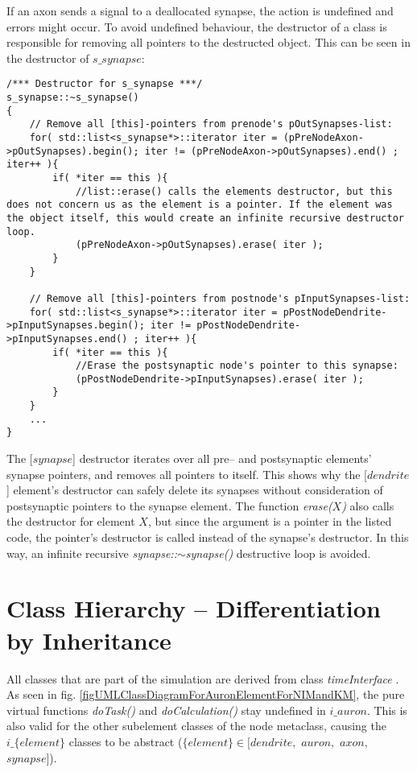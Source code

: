 			If an axon sends a signal to a deallocated synapse, the action is undefined and errors might occur.
			To avoid undefined behaviour, the destructor of a class is responsible for removing all pointers to the destructed object.
			This can be seen in the destructor of $s\_synapse$:
\begin{lstlisting}
/*** Destructor for s_synapse ***/
s_synapse::~s_synapse()
{
	// Remove all [this]-pointers from prenode's pOutSynapses-list:
	for( std::list<s_synapse*>::iterator iter = (pPreNodeAxon->pOutSynapses).begin(); iter != (pPreNodeAxon->pOutSynapses).end() ; iter++ ){
		if( *iter == this ){ 	
			//list::erase() calls the elements destructor, but this does not concern us as the element is a pointer. If the element was the object itself, this would create an infinite recursive destructor loop.
			(pPreNodeAxon->pOutSynapses).erase( iter );
		}
	}

	// Remove all [this]-pointers from postnode's pInputSynapses-list:
	for( std::list<s_synapse*>::iterator iter = pPostNodeDendrite->pInputSynapses.begin(); iter != pPostNodeDendrite->pInputSynapses.end() ; iter++ ){
		if( *iter == this ){ 
			//Erase the postsynaptic node's pointer to this synapse:
			(pPostNodeDendrite->pInputSynapses).erase( iter ); 
		}
	}
	...
}
\end{lstlisting}
		The [$synapse$] destructor iterates over all pre-- and postsynaptic elements' synapse pointers, and removes all pointers to itself.
		This shows why the [$dendrite$] element's destructor can safely delete its synapses without consideration of postsynaptic pointers to the synapse element.
		The function \emph{erase($X$)} also calls the destructor for element $X$, but since the argument is a pointer in the listed code, 
			the pointer's destructor is called instead of the synapse's destructor.
		In this way, an infinite recursive \emph{synapse::$\sim$synapse()} destructive loop is avoided. 



	\section{Class Hierarchy -- Differentiation by Inheritance}

		All classes that are part of the simulation are derived from class \emph{timeInterface} \cite{FDP_report}.
		As seen in fig. \ref{figUMLClassDiagramForAuronElementForNIMandKM}, the pure virtual functions \emph{doTask()} and \emph{doCalculation()} stay undefined in $i\_auron$.
		This is also valid for the other subelement classes of the node metaclass, causing the $i\_\{element\}$ classes to be abstract ($\{element\} \in [$$dendrite$$, $ $auron$$, $ $axon$$,$ $synapse]$).

